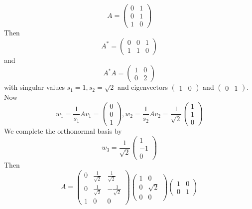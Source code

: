 \documentclass[12pt]{article}
\begin{document}
\begin{ex}
	$$A = \begin{pmatrix} 0 & 1 \\ 0 & 1 \\ 1 & 0 \end{pmatrix}$$
	Then
	$$A^* = \begin{pmatrix} 0 & 0 & 1 \\ 1 & 1 & 0 \end{pmatrix}$$
	and
	$$A^*A = \begin{pmatrix} 1 & 0 \\ 0 & 2 \end{pmatrix}$$
	with singular values $s_1=1,s_2=\sqrt{2}$ and eigenvectors $\begin{pmatrix} 1 & 0 \end{pmatrix}$ and $\begin{pmatrix} 0 & 1 \end{pmatrix}$. Now
	$$w_1 = \frac{1}{s_1}Av_1 = \begin{pmatrix} 0 \\ 0 \\ 1 \end{pmatrix}, w_2 = \frac{1}{s_2}Av_2 = \frac{1}{\sqrt{2}} \begin{pmatrix} 1 \\ 1 \\ 0 \end{pmatrix}$$
	We complete the orthonormal basis by
	$$w_3 = \frac{1}{\sqrt{2}} \begin{pmatrix} 1 \\ -1 \\ 0\end{pmatrix}$$
	Then
	$$A = \begin{pmatrix} 0 & \frac{1}{\sqrt{2}} & \frac{1}{\sqrt{2}} \\ 0 & \frac{1}{\sqrt{2}} & -\frac{1}{\sqrt{2}} \\ 1 & 0 & 0 \end{pmatrix} \begin{pmatrix} 1 & 0 \\ 0 & \sqrt{2} \\ 0 & 0 \end{pmatrix} \begin{pmatrix} 1 & 0 \\ 0 & 1 \end{pmatrix}$$
\end{ex}
\end{document}
